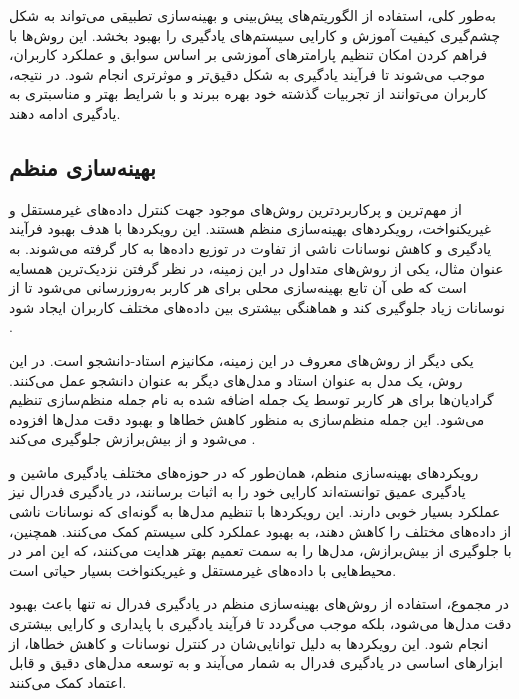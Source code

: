 به‌طور کلی، استفاده از الگوریتم‌های پیش‌بینی و بهینه‌سازی تطبیقی می‌تواند به شکل چشم‌گیری کیفیت آموزش و کارایی سیستم‌های یادگیری را بهبود بخشد. این روش‌ها با فراهم کردن امکان تنظیم پارامترهای آموزشی بر اساس سوابق و عملکرد کاربران، موجب می‌شوند تا فرآیند یادگیری به شکل دقیق‌تر و موثرتری انجام شود. در نتیجه، کاربران می‌توانند از تجربیات گذشته خود بهره ببرند و با شرایط بهتر و مناسبتری به یادگیری ادامه دهند.



\subsection{بهینه‌سازی منظم}
از مهم‌ترین و پرکاربردترین روش‌های موجود جهت کنترل داده‌های غیرمستقل و غیریکنواخت، رویکردهای بهینه‌سازی منظم هستند. این رویکردها با هدف بهبود فرآیند یادگیری و کاهش نوسانات ناشی از تفاوت در توزیع داده‌ها به کار گرفته می‌شوند. به عنوان مثال، یکی از روش‌های متداول در این زمینه، در نظر گرفتن نزدیک‌ترین همسایه است که طی آن تابع بهینه‌سازی محلی برای هر کاربر به‌روزرسانی می‌شود تا از نوسانات زیاد جلوگیری کند و هماهنگی بیشتری بین داده‌های مختلف کاربران ایجاد شود
\cite{li2020federatedheteroneneous}.

یکی دیگر از روش‌های معروف در این زمینه، مکانیزم استاد-دانشجو%
است. در این روش، یک مدل به عنوان استاد و مدل‌های دیگر به عنوان دانشجو عمل می‌کنند. گرادیان‌ها برای هر کاربر توسط یک جمله اضافه شده به نام جمله منظم‌سازی%
تنظیم می‌شود. این جمله منظم‌سازی به منظور کاهش خطاها و بهبود دقت مدل‌ها افزوده می‌شود و از بیش‌برازش%
جلوگیری می‌کند
\cite{li2020communication}.

رویکردهای بهینه‌سازی منظم، همان‌طور که در حوزه‌های مختلف یادگیری ماشین و یادگیری عمیق توانسته‌اند کارایی خود را به اثبات برسانند، در یادگیری فدرال نیز عملکرد بسیار خوبی دارند. این رویکردها با تنظیم مدل‌ها به گونه‌ای که نوسانات ناشی از داده‌های مختلف را کاهش دهند، به بهبود عملکرد کلی سیستم کمک می‌کنند. همچنین، با جلوگیری از بیش‌برازش، مدل‌ها را به سمت تعمیم بهتر هدایت می‌کنند، که این امر در محیط‌هایی با داده‌های غیرمستقل و غیریکنواخت بسیار حیاتی است.

در مجموع، استفاده از روش‌های بهینه‌سازی منظم در یادگیری فدرال نه تنها باعث بهبود دقت مدل‌ها می‌شود، بلکه موجب می‌گردد تا فرآیند یادگیری با پایداری و کارایی بیشتری انجام شود. این رویکردها به دلیل توانایی‌شان در کنترل نوسانات و کاهش خطاها، از ابزارهای اساسی در یادگیری فدرال به شمار می‌آیند و به توسعه مدل‌های دقیق و قابل اعتماد کمک می‌کنند.



